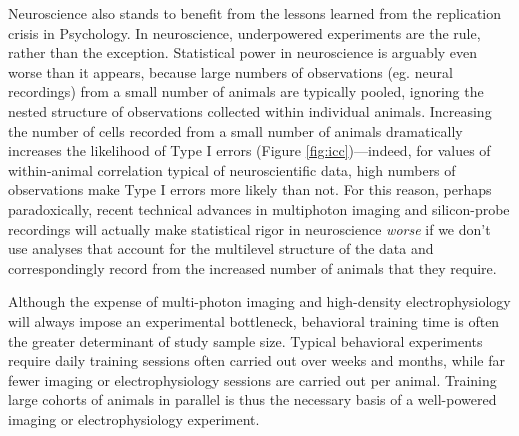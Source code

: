 Neuroscience also stands to benefit from the lessons learned from the replication crisis in Psychology\citep{shroutPsychologyScienceKnowledge2018}. In neuroscience, underpowered experiments are the rule, rather than the exception\citep{buttonPowerFailureWhy2013}. Statistical power in neuroscience is arguably even worse than it appears, because large numbers of observations (eg. neural recordings) from a small number of animals are typically pooled, ignoring the nested structure of observations collected within individual animals. Increasing the number of cells recorded from a small number of animals dramatically increases the likelihood of Type I errors (Figure \ref{fig:icc})---indeed, for values of within-animal correlation typical of neuroscientific data, high numbers of observations make Type I errors more likely than not\citep{aartsSolutionDependencyUsing2014}. For this reason, perhaps paradoxically, recent technical advances in multiphoton imaging and silicon-probe recordings will actually make statistical rigor in neuroscience \textit{worse} if we don't use analyses that account for the multilevel structure of the data and correspondingly record from the increased number of animals that they require.




Although the expense of multi-photon imaging and high-density electrophysiology will always impose an experimental bottleneck, behavioral training time is often the greater determinant of study sample size. Typical behavioral experiments require daily training sessions often carried out over weeks and months, while far fewer imaging or electrophysiology sessions are carried out per animal.  Training large cohorts of animals in parallel is thus the necessary basis of a well-powered imaging or electrophysiology experiment.


